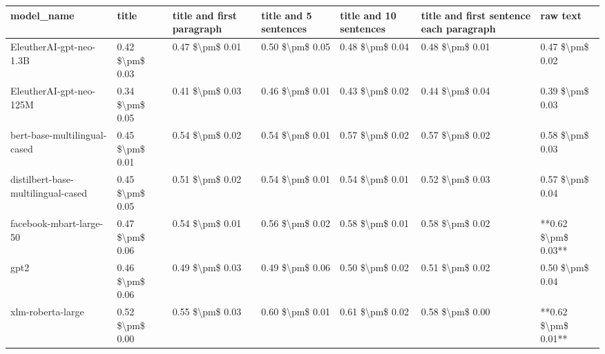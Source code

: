 \begin{tabular}{lllllll}
\toprule
                        model\_name &           title & title and first paragraph & title and 5 sentences & title and 10 sentences & title and first sentence each paragraph &            raw text \\
\midrule
           EleutherAI-gpt-neo-1.3B & 0.42 \$\textbackslash pm\$ 0.03 &           0.47 \$\textbackslash pm\$ 0.01 &       0.50 \$\textbackslash pm\$ 0.05 &        0.48 \$\textbackslash pm\$ 0.04 &                         0.48 \$\textbackslash pm\$ 0.01 &     0.47 \$\textbackslash pm\$ 0.02 \\
           EleutherAI-gpt-neo-125M & 0.34 \$\textbackslash pm\$ 0.05 &           0.41 \$\textbackslash pm\$ 0.03 &       0.46 \$\textbackslash pm\$ 0.01 &        0.43 \$\textbackslash pm\$ 0.02 &                         0.44 \$\textbackslash pm\$ 0.04 &     0.39 \$\textbackslash pm\$ 0.03 \\
      bert-base-multilingual-cased & 0.45 \$\textbackslash pm\$ 0.01 &           0.54 \$\textbackslash pm\$ 0.02 &       0.54 \$\textbackslash pm\$ 0.01 &        0.57 \$\textbackslash pm\$ 0.02 &                         0.57 \$\textbackslash pm\$ 0.02 &     0.58 \$\textbackslash pm\$ 0.03 \\
distilbert-base-multilingual-cased & 0.45 \$\textbackslash pm\$ 0.05 &           0.51 \$\textbackslash pm\$ 0.02 &       0.54 \$\textbackslash pm\$ 0.01 &        0.54 \$\textbackslash pm\$ 0.01 &                         0.52 \$\textbackslash pm\$ 0.03 &     0.57 \$\textbackslash pm\$ 0.04 \\
           facebook-mbart-large-50 & 0.47 \$\textbackslash pm\$ 0.06 &           0.54 \$\textbackslash pm\$ 0.01 &       0.56 \$\textbackslash pm\$ 0.02 &        0.58 \$\textbackslash pm\$ 0.01 &                         0.58 \$\textbackslash pm\$ 0.02 & **0.62 \$\textbackslash pm\$ 0.03** \\
                              gpt2 & 0.46 \$\textbackslash pm\$ 0.06 &           0.49 \$\textbackslash pm\$ 0.03 &       0.49 \$\textbackslash pm\$ 0.06 &        0.50 \$\textbackslash pm\$ 0.02 &                         0.51 \$\textbackslash pm\$ 0.02 &     0.50 \$\textbackslash pm\$ 0.04 \\
                 xlm-roberta-large & 0.52 \$\textbackslash pm\$ 0.00 &           0.55 \$\textbackslash pm\$ 0.03 &       0.60 \$\textbackslash pm\$ 0.01 &        0.61 \$\textbackslash pm\$ 0.02 &                         0.58 \$\textbackslash pm\$ 0.00 & **0.62 \$\textbackslash pm\$ 0.01** \\
\bottomrule
\end{tabular}
